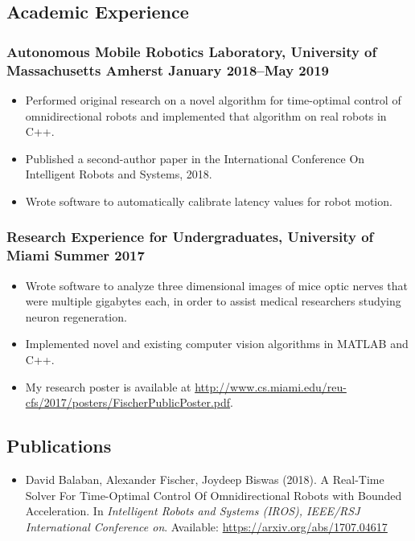 \documentclass{article}
\begin{document}
			\subsection*{Academic Experience}
			\subsubsection*{Autonomous Mobile Robotics Laboratory, University of Massachusetts Amherst \hfill \normalfont \normalsize January 2018--May 2019}
			\begin{itemize}[noitemsep,leftmargin=40pt]
				\item Performed original research on a novel algorithm for time-optimal control of omnidirectional robots and implemented that algorithm on real robots in C++.
				\item Published a second-author paper in the International Conference On Intelligent Robots and Systems, 2018.
				\item Wrote software to automatically calibrate latency values for robot motion.
			\end{itemize}
			\subsubsection*{Research Experience for Undergraduates, University of Miami \hfill \normalfont \normalsize Summer 2017}
			\begin{itemize}[noitemsep,leftmargin=40pt]
				\item Wrote software to analyze three dimensional images of mice optic nerves that were multiple gigabytes each, in order to assist medical researchers studying neuron regeneration.
				\item Implemented novel and existing computer vision algorithms in MATLAB and C++.
				\item My research poster is available at \href{http://www.cs.miami.edu/reu-cfs/2017/posters/FischerPublicPoster.pdf}{http://www.cs.miami.edu/reu-cfs/2017/posters/FischerPublicPoster.pdf}.
			\end{itemize}
			\subsection*{Publications}
			\begin{itemize}[noitemsep,leftmargin=40pt]
				\item David Balaban, Alexander Fischer, Joydeep Biswas (2018). A Real-Time Solver For Time-Optimal Control Of Omnidirectional Robots with Bounded Acceleration. In \textit{Intelligent Robots and Systems (IROS), IEEE/RSJ International Conference on}. Available: \href{https://arxiv.org/abs/1707.04617}{https://arxiv.org/abs/1707.04617}
			\end{itemize}
\end{document}
